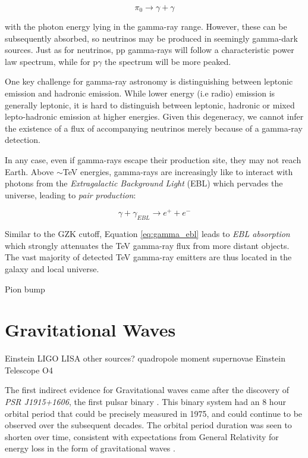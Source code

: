 \begin{equation}
	\pi_{0} \rightarrow \gamma + \gamma
\end{equation}

with the photon energy lying in the gamma-ray range. However, these can be subsequently absorbed, so neutrinos may be produced in seemingly gamma-dark sources. Just as for neutrinos, pp gamma-rays will follow a characteristic power law spectrum, while for p$\gamma$ the spectrum will be more peaked.

One key challenge for gamma-ray astronomy is distinguishing between leptonic emission and hadronic emission. While lower energy (i.e radio) emission is generally leptonic, it is hard to distinguish between leptonic, hadronic or mixed lepto-hadronic emission at higher energies. Given this degeneracy, we cannot infer the existence of a flux of accompanying neutrinos merely because of a gamma-ray detection.

In any case, even if gamma-rays escape their production site, they may not reach Earth. Above $\sim$TeV energies, gamma-rays are increasingly like to interact with photons from the \emph{Extragalactic Background Light} (EBL) which pervades the universe, leading to \emph{pair production}: 

\begin{equation}
	\gamma + \gamma_{EBL} \rightarrow e^{+} + e^{-} 
	\label{eq:gamma_ebl}
\end{equation}

Similar to the GZK cutoff, Equation \ref{eq:gamma_ebl} leads to \emph{EBL absorption} which strongly attenuates the TeV gamma-ray flux from more distant objects. The vast majority of detected TeV gamma-ray emitters are thus located in the galaxy and local universe.
 
Pion bump

\section{Gravitational Waves}

Einstein
LIGO
LISA
other sources?
quadropole moment
supernovae
Einstein Telescope
O4

The first indirect evidence for Gravitational waves came after the discovery of \emph{PSR J1915+1606}, the first pulsar binary . This binary system had an 8 hour orbital period that could be precisely measured in 1975, and could continue to be observed over the subsequent decades. The orbital period duration was seen to shorten over time, consistent with expectations from General Relativity for energy loss in the form of gravitational waves . 

